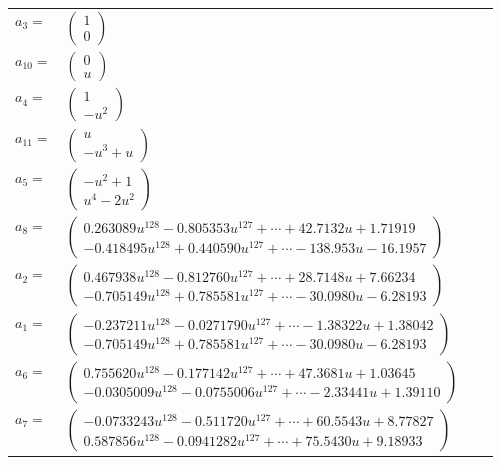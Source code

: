 \documentclass[1p]{elsarticle_modified}
\theoremstyle{definition}
\begin{document}
\begin{tabular}{m{7pt} m{180pt} m{7pt} m{180pt} }
\flushright $a_{3}=$&$\begin{pmatrix}1\\0\end{pmatrix}$ \\
\flushright $a_{10}=$&$\begin{pmatrix}0\\u\end{pmatrix}$ \\
\flushright $a_{4}=$&$\begin{pmatrix}1\\- u^2\end{pmatrix}$ \\
\flushright $a_{11}=$&$\begin{pmatrix}u\\- u^3+u\end{pmatrix}$ \\
\flushright $a_{5}=$&$\begin{pmatrix}- u^2+1\\u^4-2 u^2\end{pmatrix}$ \\
\flushright $a_{8}=$&$\begin{pmatrix}0.263089 u^{128}-0.805353 u^{127}+\cdots+42.7132 u+1.71919\\-0.418495 u^{128}+0.440590 u^{127}+\cdots-138.953 u-16.1957\end{pmatrix}$ \\
\flushright $a_{2}=$&$\begin{pmatrix}0.467938 u^{128}-0.812760 u^{127}+\cdots+28.7148 u+7.66234\\-0.705149 u^{128}+0.785581 u^{127}+\cdots-30.0980 u-6.28193\end{pmatrix}$ \\
\flushright $a_{1}=$&$\begin{pmatrix}-0.237211 u^{128}-0.0271790 u^{127}+\cdots-1.38322 u+1.38042\\-0.705149 u^{128}+0.785581 u^{127}+\cdots-30.0980 u-6.28193\end{pmatrix}$ \\
\flushright $a_{6}=$&$\begin{pmatrix}0.755620 u^{128}-0.177142 u^{127}+\cdots+47.3681 u+1.03645\\-0.0305009 u^{128}-0.0755006 u^{127}+\cdots-2.33441 u+1.39110\end{pmatrix}$ \\
\flushright $a_{7}=$&$\begin{pmatrix}-0.0733243 u^{128}-0.511720 u^{127}+\cdots+60.5543 u+8.77827\\0.587856 u^{128}-0.0941282 u^{127}+\cdots+75.5430 u+9.18933\end{pmatrix}$ \\

\end{tabular}
\end{document}
